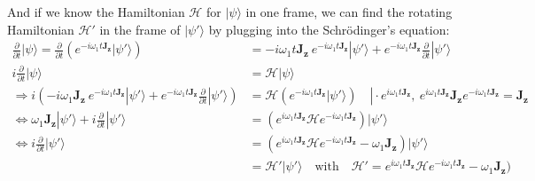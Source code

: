 \documentclass[11.5pt,a4paper]{article}
\begin{document}
And if we know the Hamiltonian $\mathcal{H}$ for $|\psi\rangle$ in one frame, we can find the rotating Hamiltonian $\mathcal{H}'$ in the frame of $|\psi'\rangle$ by plugging into the Schr\"odinger's equation:
\begin{align} 
  \frac{\partial}{\partial t} |\psi\rangle  =  \frac{\partial}{\partial t} \left( e^{-i \omega_1 t \mathbf{J_z}} | \psi' \rangle  \right) & = - i \omega_1 t \mathbf{J_z} \ e^{-i \omega_1 t \mathbf{J_z}} | \psi' \rangle + e^{-i \omega_1 t \mathbf{J_z}} \frac{\partial}{\partial t} | \psi' \rangle \\
  i\frac{\partial}{\partial t} |\psi\rangle   & = \mathcal{H} |\psi\rangle  \\
  \Rightarrow i \left( - i \omega_1 \mathbf{J_z} \ e^{-i \omega_1 t \mathbf{J_z}} | \psi' \rangle + e^{-i \omega_1 t \mathbf{J_z}} \frac{\partial}{\partial t} | \psi' \rangle \right)& = \mathcal{H} \left( e^{-i \omega_1 t \mathbf{J_z}} |\psi'\rangle \right) 
  \quad \left. \right| \cdot e^{i \omega_1 t \mathbf{J_z}},\ e^{i \omega_1 t \mathbf{J_z}} \mathbf{J_z} e^{-i \omega_1 t \mathbf{J_z}}= \mathbf{J_z} \\
  \Leftrightarrow \omega_1 \mathbf{J_z} | \psi' \rangle + i \frac{\partial}{\partial t} | \psi' \rangle & = \left( e^{i \omega_1 t \mathbf{J_z}} \mathcal{H} e^{-i \omega_1 t \mathbf{J_z}} \right) |\psi'\rangle \\
  \Leftrightarrow i \frac{\partial}{\partial t} | \psi' \rangle & = \left( e^{i \omega_1 t \mathbf{J_z}} \mathcal{H} e^{-i \omega_1 t \mathbf{J_z}}- \omega_1  \mathbf{J_z} \right) |\psi'\rangle \\
  & = \mathcal{H}'|\psi'\rangle \quad \text{with} \quad \mathcal{H}' = e^{i \omega_1 t \mathbf{J_z}} \mathcal{H} e^{-i \omega_1 t \mathbf{J_z}}- \omega_1  \mathbf{J_z} 
  \label{eq-rotating-hamiltonian}) 
\end{align}
\end{document}
